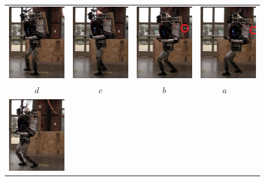 \begin{figure}
\centering
  \begin{tabular}{cccc}
    \includegraphics[width=1.4in]{STYLESTUFF/atw4} &
    \includegraphics[width=1.4in]{STYLESTUFF/atw3} &
    \includegraphics[width=1.4in]{STYLESTUFF/atw2p} &
    \includegraphics[width=1.4in]{STYLESTUFF/atw1p} \\
    $d$ & $c$ & $b$ & $a$ ~\\[2ex]
    \includegraphics[width=1.4in]{STYLESTUFF/atw8} &

\end{tabular}
\end{figure}
